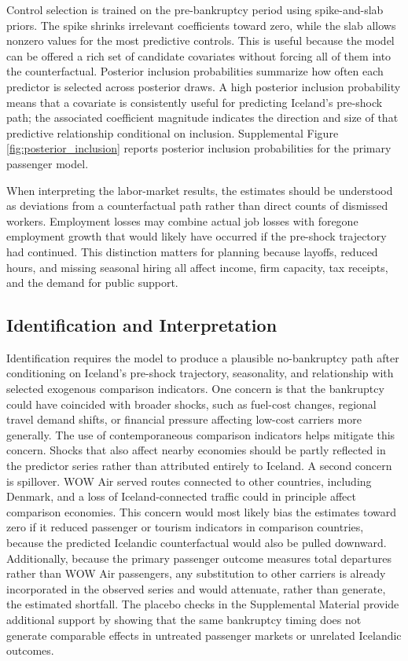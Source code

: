\documentclass[12pt]{article}
\begin{document}
Control selection is trained on the pre-bankruptcy period using spike-and-slab priors. The spike shrinks irrelevant coefficients toward zero, while the slab allows nonzero values for the most predictive controls. This is useful because the model can be offered a rich set of candidate covariates without forcing all of them into the counterfactual. Posterior inclusion probabilities summarize how often each predictor is selected across posterior draws. A high posterior inclusion probability means that a covariate is consistently useful for predicting Iceland's pre-shock path; the associated coefficient magnitude indicates the direction and size of that predictive relationship conditional on inclusion. Supplemental Figure \ref{fig:posterior_inclusion} reports posterior inclusion probabilities for the primary passenger model.

When interpreting the labor-market results, the estimates should be understood as deviations from a counterfactual path rather than direct counts of dismissed workers. Employment losses may combine actual job losses with foregone employment growth that would likely have occurred if the pre-shock trajectory had continued. This distinction matters for planning because layoffs, reduced hours, and missing seasonal hiring all affect income, firm capacity, tax receipts, and the demand for public support.\subsection{Identification and Interpretation}\label{sec:identification}

Identification requires the model to produce a plausible no-bankruptcy path after conditioning on Iceland's pre-shock trajectory, seasonality, and relationship with selected exogenous comparison indicators. One concern is that the bankruptcy could have coincided with broader shocks, such as fuel-cost changes, regional travel demand shifts, or financial pressure affecting low-cost carriers more generally. The use of contemporaneous comparison indicators helps mitigate this concern. Shocks that also affect nearby economies should be partly reflected in the predictor series rather than attributed entirely to Iceland. A second concern is spillover. WOW Air served routes connected to other countries, including Denmark, and a loss of Iceland-connected traffic could in principle affect comparison economies. This concern would most likely bias the estimates toward zero if it reduced passenger or tourism indicators in comparison countries, because the predicted Icelandic counterfactual would also be pulled downward. Additionally, because the primary passenger outcome measures total departures rather than WOW Air passengers, any substitution to other carriers is already incorporated in the observed series and would attenuate, rather than generate, the estimated shortfall. The placebo checks in the Supplemental Material provide additional support by showing that the same bankruptcy timing does not generate comparable effects in untreated passenger markets or unrelated Icelandic outcomes.
\end{document}
